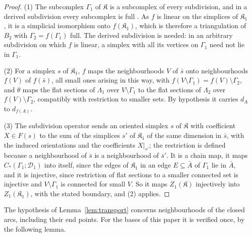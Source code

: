 \begin{proof}
(1) The subcomplex $\Gamma_1$ of $\mathfrak K$ is a subcomplex of every subdivision, and in a derived subdivision every
subcomplex is full \cite[Ch.~3]{RS}. As $f$ is linear on the simplices of $\mathfrak K_1$, it is a simplicial isomorphism
onto $f(\mathfrak K_1)$, which is therefore a triangulation of $B_2$ with $\Gamma_2=f(\Gamma_1)$ full. The derived
subdivision is needed: in an arbitrary subdivision on which $f$ is linear, a simplex with all its vertices on $\Gamma_1$
need not lie in $\Gamma_1$.

(2) For a simplex $s$ of $\mathfrak K_1$, $f$ maps the neighbourhoods $V$ of $\bar s$ onto neighbourhoods $f(V)$ of
$f(\bar s)$, all small ones arising in this way, with $f(V\setminus\Gamma_1)=f(V)\setminus\Gamma_2$, and $\theta$ maps the
flat sections of $\Lambda_1$ over $V\setminus\Gamma_1$ to the flat sections of $\Lambda_2$ over $f(V)\setminus\Gamma_2$,
compatibly with restriction to smaller sets. By hypothesis it carries $d_A$ to $d_{f(A)}$.

(3) The subdivision operator sends an oriented simplex $s$ of $\mathfrak K$ with coefficient $X\in F(s)$ to the sum of the
simplices $s'$ of $\mathfrak K_1$ of the same dimension in $\bar s$, with the induced orientations and the coefficients
$X|_{s'}$; the restriction is defined because a neighbourhood of $\bar s$ is a neighbourhood of $\bar s'$. It is a chain
map, it maps $C_*(\Gamma_1;\mathcal D_1)$ into itself, since the edges of $\mathfrak K_1$ in an edge $E\subseteq\bar A$ of
$\Gamma_1$ lie in $\bar A$, and it is injective, since restriction of flat sections to a smaller connected set is injective and
$V\setminus\Gamma_1$ is connected for small $V$. So it maps $Z_1(\mathfrak K)$ injectively into $Z_1(\mathfrak K_1)$, with
the stated boundary, and (2) applies.
\end{proof}

The hypothesis of Lemma~\ref{lem:transport} concerns neighbourhoods of the closed arcs, including their end points. For the
bases of this paper it is verified once, by the following lemma.

